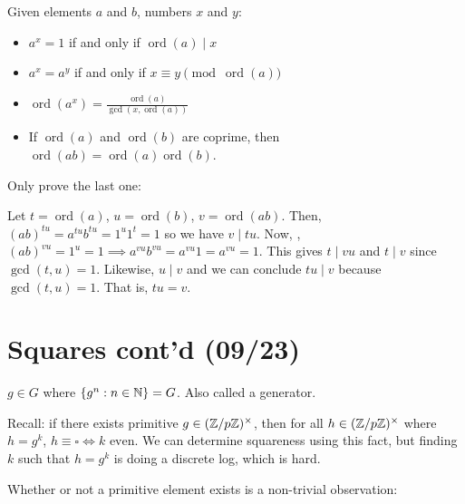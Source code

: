 \documentclass[notes]{agony}
\newcommand{\ord}{\operatorname{ord}}
\begin{document}
\begin{lemma}
  Given elements $a$ and $b$, numbers $x$ and $y$:
  \begin{itemize}[nosep]
    \item $a^x = 1$ if and only if $\ord(a) \mid x$
    \item $a^x = a^y$ if and only if $x \equiv y \pmod{\ord(a)}$
    \item $\ord(a^x) = \frac{\ord(a)}{\gcd(x,\ord(a))}$
    \item If $\ord(a)$ and $\ord(b)$ are coprime,
          then $\ord(ab) = \ord(a)\ord(b)$.
  \end{itemize}
\end{lemma}
\begin{prf}
  Only prove the last one:

  Let $t=\ord(a)$, $u=\ord(b)$, $v=\ord(ab)$.
  Then, $(ab)^{tu} = a^{tu}b^{tu} = 1^u 1^t = 1$ so we have $v \mid tu$.
  Now, \Wlog, $(ab)^{vu} = 1^u = 1 \implies a^{vu}b^{vu} = a^{vu}1 = a^{vu} = 1$.
  This gives $t \mid vu$ and $t \mid v$ since $\gcd(t,u)=1$.
  Likewise, $u \mid v$ and we can conclude $tu \mid v$ because $\gcd(t,u)=1$.
  That is, $tu = v$.
\end{prf}


\section{Squares cont'd (09/23)}

\begin{defn}
  $g \in G$ where $\{g^n : n \in \mathbb{N}\} = G$.
  Also called a generator.
\end{defn}

Recall: if there exists primitive $g \in (\mathbb{Z}/p\mathbb{Z})^\times$,
then for all $h \in (\mathbb{Z}/p\mathbb{Z})^\times$ where $h=g^k$,
$h \equiv \square \iff \text{$k$ even}$.
We can determine squareness using this fact,
but finding $k$ such that $h = g^k$ is doing a discrete log, which is hard.

Whether or not a primitive element exists is a non-trivial observation:
\end{document}
